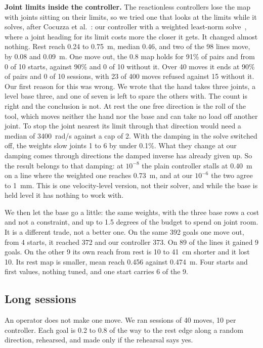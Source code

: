\documentclass[pdflatex,sn-mathphys-num]{sn-jnl}
\begin{document}
\textbf{Joint limits inside the controller.} The reactionless controllers lose the map with joints sitting on their
limits, so we tried one that looks at the limits while it solves, after Cocuzza et al.~\cite{cocuzza2011}: our
controller with a weighted least-norm solve~\cite{chan1995}, where a joint heading for its limit costs more the
closer it gets. It changed almost nothing. Rest reach 0.24 to 0.75~m, median 0.46, and two of the 98 lines move, by
0.08 and 0.09~m. One move out, the 0.8 map holds for 91\% of pairs and from 0 of 10 starts, against 90\% and 0 of 10
without it. Over 40 moves it ends at 90\% of pairs and 0 of 10 sessions, with 23 of 400 moves refused against 15
without it. Our first reason for this was wrong. We wrote that the hand takes three joints, a level base three, and
one of seven is left to spare the others with. The count is right and the conclusion is not. At rest the one free
direction is the roll of the tool, which moves neither the hand nor the base and can take no load off another joint.
To stop the joint nearest its limit through that direction would need a median of 3400~rad/s against a cap of 2.
With the damping in the solve switched off, the weights slow joints 1 to 6 by under 0.1\%. What they change at our
damping comes through directions the damped inverse has already given up. So the result belongs to that damping: at
$10^{-8}$ the plain controller stalls at 0.40~m on a line where the weighted one reaches 0.73~m, and at our
$10^{-6}$ the two agree to 1~mm. This is one velocity-level version, not their solver, and while the base is held
level it has nothing to work with.

We then let the base go a little: the same weights, with the three base rows a cost and not a constraint, and up to
1.5 degrees of the budget to spend on joint room. It is a different trade, not a better one. On the same 392 goals
one move out, from 4 starts, it reached 372 and our controller 373. On 89 of the lines it gained 9 goals. On the
other 9 its own reach from rest is 10 to 41~cm shorter and it lost 10. Its rest map is smaller, mean reach 0.456
against 0.474~m. Four starts and first values, nothing tuned, and one start carries 6 of the 9. %

\subsection{Long sessions}
An operator does not make one move. We ran sessions of 40 moves, 10 per controller. Each goal is 0.2 to 0.8 of the
way to the rest edge along a random direction, rehearsed, and made only if the rehearsal says yes.
\end{document}
